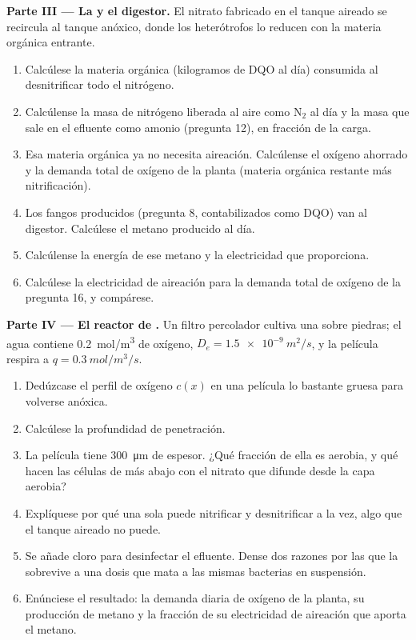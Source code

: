 \begin{problem}
\medskip
\noindent\textbf{Parte III --- La  y el digestor.}
El nitrato fabricado en el tanque aireado se recircula al tanque anóxico,
donde los heterótrofos lo reducen con la materia orgánica entrante.
\begin{enumerate}[resume]
  \item Calcúlese la materia orgánica (kilogramos de DQO al día)
        consumida al desnitrificar todo el nitrógeno.
  \item Calcúlense la masa de nitrógeno liberada al aire como
        $\mathrm{N_2}$ al día y la masa que sale en el efluente como
        amonio (pregunta 12), en fracción de la carga.
  \item Esa materia orgánica ya no necesita aireación. Calcúlense el
        oxígeno ahorrado y la demanda total de oxígeno de la planta
        (materia orgánica restante más nitrificación).
  \item Los fangos producidos (pregunta 8, contabilizados como DQO) van
        al digestor. Calcúlese el metano producido al día.
  \item Calcúlense la energía de ese metano y la electricidad que
        proporciona.
  \item Calcúlese la electricidad de aireación para la demanda total de
        oxígeno de la pregunta 16, y compárese.
\end{enumerate}

\medskip
\noindent\textbf{Parte IV --- El reactor de .}
Un filtro percolador cultiva una  sobre piedras; el agua
contiene \qty{0.2}{mol/m^3} de oxígeno, $D_e = \qty{1.5e-9}{m^2/s}$, y
la película respira a $q = \qty{0.3}{mol/m^3/s}$.
\begin{enumerate}[resume]
  \item Dedúzcase el perfil de oxígeno $c(x)$ en una película lo bastante
        gruesa para volverse anóxica.
  \item Calcúlese la profundidad de penetración.
  \item La película tiene \qty{300}{\micro m} de espesor. ¿Qué fracción de
        ella es aerobia, y qué hacen las células de más abajo con el
        nitrato que difunde desde la capa aerobia?
  \item Explíquese por qué una sola  puede nitrificar y
        desnitrificar a la vez, algo que el tanque aireado no puede.
  \item Se añade cloro para desinfectar el efluente. Dense dos razones
        por las que la  sobrevive a una dosis que mata a las
        mismas bacterias en suspensión.
  \item Enúnciese el resultado: la demanda diaria de oxígeno de la
        planta, su producción de metano y la fracción de su electricidad
        de aireación que aporta el metano.
\end{enumerate}
\end{problem}
